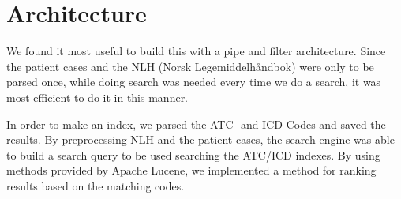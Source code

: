 \section{Architecture}
\label{sec:architecture}

We found it most useful to build this with a pipe and filter architecture. Since the patient cases and the NLH (Norsk Legemiddelhåndbok) were only to be parsed once, while doing search was needed every time we do a search, it was most efficient to do it in this manner.


In order to make an index, we parsed the ATC- and ICD-Codes and saved the results. By preprocessing NLH and the patient cases, the search engine was able to build a search query to be used searching the ATC/ICD indexes. By using methods provided by Apache Lucene, we implemented a method for ranking results based on the matching codes. 


